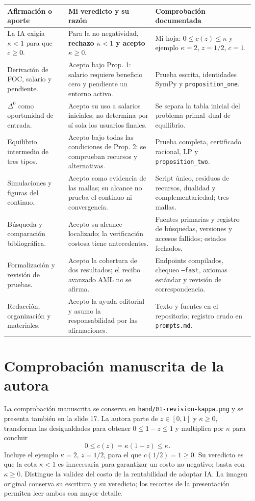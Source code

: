 \documentclass[11pt]{article}
\begin{document}
\begin{center}\small
\begin{tabular}{p{.23\linewidth}p{.29\linewidth}p{.38\linewidth}}\toprule
Afirmación o aporte & Mi veredicto y su razón & Comprobación documentada\\\midrule
La IA exigía $\kappa<1$ para que $c\geq0$. & Para la no negatividad, \textbf{rechazo $\kappa<1$ y acepto $\kappa\geq0$}. & Mi hoja: $0\leq c(z)\leq\kappa$ y ejemplo $\kappa=2$, $z=1/2$, $c=1$.\\[5pt]
Derivación de FOC, salario y pendiente. & Acepto bajo Prop. 1: salario requiere beneficio cero y pendiente un entorno activo. & Prueba escrita, identidades SymPy y \texttt{proposition\_one}.\\[5pt]
$\Delta^0$ como oportunidad de entrada. & Acepto su uso a salarios iniciales; no determina por sí sola los usuarios finales. & Se separa la tabla inicial del problema primal--dual de equilibrio.\\[5pt]
Equilibrio intermedio de tres tipos. & Acepto bajo todas las condiciones de Prop. 2: se comprueban recursos y alternativas. & Prueba completa, certificado racional, LP y \texttt{proposition\_two}.\\[5pt]
Simulaciones y figuras del continuo. & Acepto como evidencia de las mallas; su alcance no prueba el continuo ni convergencia. & Script único, residuos de recursos, dualidad y complementariedad; tres mallas.\\[5pt]
Búsqueda y comparación bibliográfica. & Acepto su alcance localizado; la verificación costosa tiene antecedentes. & Fuentes primarias y registro de búsquedas, versiones y accesos fallidos; estados fechados.\\[5pt]
Formalización y revisión de pruebas. & Acepto la cobertura de dos resultados; el recibo avanzado AML no se afirma. & Endpoints compilados, chequeo \texttt{--fast}, axiomas estándar y revisión de correspondencia.\\[5pt]
Redacción, organización y materiales. & Acepto la ayuda editorial y asumo la responsabilidad por las afirmaciones. & Texto y fuentes en el repositorio; registro crudo en \texttt{prompts.md}.\\\bottomrule
\end{tabular}
\end{center}

\section{Comprobación manuscrita de la autora}
La comprobación manuscrita se conserva en \texttt{hand/01-revision-kappa.png} y se presenta también en la slide 17. La autora parte de $z\in[0,1]$ y $\kappa\geq0$, transforma las desigualdades para obtener $0\leq1-z\leq1$ y multiplica por $\kappa$ para concluir
\[
0\leq c(z)=\kappa(1-z)\leq\kappa.
\]
Incluye el ejemplo $\kappa=2$, $z=1/2$, para el que $c(1/2)=1\geq0$. Su veredicto es que la cota $\kappa<1$ es innecesaria para garantizar un costo no negativo; basta con $\kappa\geq0$. Distingue la validez del costo de la rentabilidad de adoptar IA. La imagen original conserva su escritura y su veredicto; los recortes de la presentación permiten leer ambos con mayor detalle.
\end{document}

